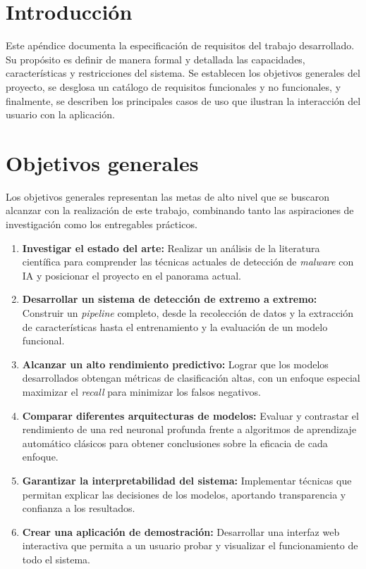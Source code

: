 
\section{Introducción}

Este apéndice documenta la especificación de requisitos del trabajo desarrollado. Su propósito es definir de manera formal y detallada las capacidades, características y restricciones del sistema. Se establecen los objetivos generales del proyecto, se desglosa un catálogo de requisitos funcionales y no funcionales, y finalmente, se describen los principales casos de uso que ilustran la interacción del usuario con la aplicación.

\section{Objetivos generales}
Los objetivos generales representan las metas de alto nivel que se buscaron alcanzar con la realización de este trabajo, combinando tanto las aspiraciones de investigación como los entregables prácticos.

\begin{enumerate}
	\item \textbf{Investigar el estado del arte:} Realizar un análisis de la literatura científica para comprender las técnicas actuales de detección de \textit{malware} con IA y posicionar el proyecto en el panorama actual.
	
	\item \textbf{Desarrollar un sistema de detección de extremo a extremo:} Construir un \textit{pipeline} completo, desde la recolección de datos y la extracción de características hasta el entrenamiento y la evaluación de un modelo funcional.
	
	\item \textbf{Alcanzar un alto rendimiento predictivo:} Lograr que los modelos desarrollados obtengan métricas de clasificación altas, con un enfoque especial maximizar el \textit{recall} para minimizar los falsos negativos.
	
	\item \textbf{Comparar diferentes arquitecturas de modelos:} Evaluar y contrastar el rendimiento de una red neuronal profunda frente a algoritmos de aprendizaje automático clásicos para obtener conclusiones sobre la eficacia de cada enfoque.
	
	\item \textbf{Garantizar la interpretabilidad del sistema:} Implementar técnicas que permitan explicar las decisiones de los modelos, aportando transparencia y confianza a los resultados.
	
	\item \textbf{Crear una aplicación de demostración:} Desarrollar una interfaz web interactiva que permita a un usuario probar y visualizar el funcionamiento de todo el sistema.
\end{enumerate}


